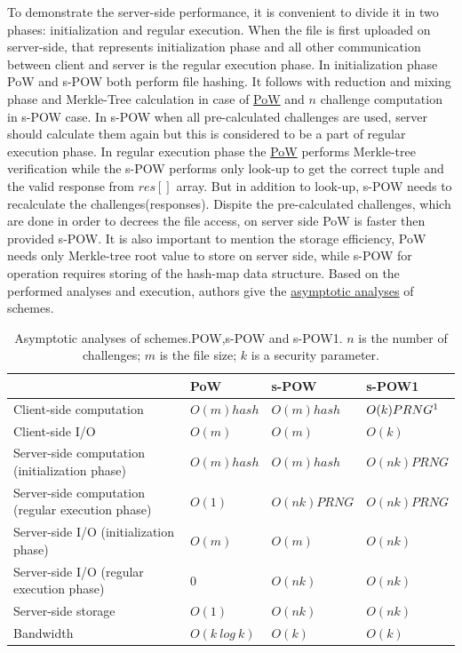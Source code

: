 \documentclass[12pt]{article}
\begin{document}
To demonstrate the server-side performance, it is convenient to divide it in two phases: initialization and regular execution. When the file is first uploaded on server-side, that represents initialization phase and all other communication between client and server is the regular execution phase. In initialization phase PoW and s-POW both perform file hashing. It follows with reduction and mixing phase and Merkle-Tree calculation in case of  \hyperref[sub:Soltuion1]{PoW} and $n$ challenge computation in s-POW case. In s-POW when all pre-calculated challenges are used, server should calculate them again but this is considered to be a part of regular execution phase. In regular execution phase the  \hyperref[sub:Soltuion1]{PoW}  performs Merkle-tree verification while the s-POW performs only look-up to get the correct tuple and the valid response from $res[]$  array. But in addition to look-up, s-POW needs to recalculate the challenges(responses). Dispite the pre-calculated challenges, which are done in order to decrees the file access, on server side PoW is faster then provided s-POW. It is also important to mention the storage efficiency, PoW needs only Merkle-tree root value to store on server side, while s-POW for operation requires storing of the hash-map data structure.  Based on the performed analyses and execution, authors give the \hyperref[table:asymptoticAnalysis]{asymptotic analyses} of schemes. 


\begin{savenotes}
\begin{table}[!htpb]
\centering
\addtolength{\tabcolsep}{3pt}
\begin{tabular}{|L{6cm}|L{2.5cm}|L{2.5cm}|L{2.5cm}|}
\hline
&PoW&s-POW&s-POW1\\
\hline
Client-side computation&$O(m)hash$ & $O(m)hash$ & $O(k)PRNG\footnote{Pseudorandom number generator}$ \\
\hline
Client-side I/O&$O(m)$&$O(m)$&$O(k)$\\
\hline
Server-side computation (initialization phase)&$O(m) hash$&$O(m) hash$&$O(nk)PRNG$\\
\hline
Server-side computation (regular execution phase)&$O(1)$&$O(nk) PRNG$& $O(nk)PRNG$\\
\hline
Server-side I/O (initialization phase)&$O(m)$&$O(m)$&$O(nk)$\\
\hline
Server-side I/O (regular execution phase)&$0$&$O(nk)$&$O(nk)$\\
\hline
Server-side storage&$O(1)$&$O(nk)$&$O(nk)$\\
\hline
Bandwidth&$O(k\ log\ k)$&$O(k)$&$O(k)$\\
\hline

\end{tabular}
\caption{Asymptotic analyses of schemes.POW,s-POW and s-POW1. $n$ is the number of challenges; $m$ is the file size; $k$ is a security parameter. \cite{DiPietro}}
\label{table:asymptoticAnalysis}
\end{table}
\end{savenotes}
\end{document}
